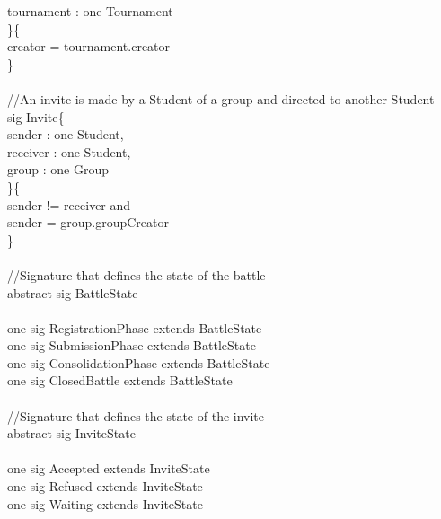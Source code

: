\documentclass{article}
\begin{document}
{\-\hspace{1cm}    tournament : \color{blue} one \color{black} Tournament\\
\}\{\\
\-\hspace{1cm}    creator \color{blue} = \color{black} tournament.creator\\
\}\\
\\
\color{gray}
//An invite is made by a Student of a group and directed to another Student\\
\color{blue}
sig
\color{black}
Invite\{\\
\-\hspace{1cm}    sender : \color{blue} one \color{black} Student,\\
\-\hspace{1cm}    receiver : \color{blue} one \color{black} Student,\\
\-\hspace{1cm}    group : \color{blue} one \color{black} Group\\
\}\{\\
\-\hspace{1cm}    sender \color{blue} != \color{black} receiver \color{blue} and \color{black}\\
\-\hspace{1cm}    sender \color{blue} = \color{black} group.groupCreator \\
\}\\
\\
\color{gray}
//Signature that defines the state of the battle\\
\color{blue} abstract sig \color{black} BattleState{}\\
\\
\color{blue} one sig \color{black}  RegistrationPhase \color{blue} extends \color{black} BattleState{}\\
\color{blue} one sig \color{black}  SubmissionPhase \color{blue} extends \color{black} BattleState{}\\
\color{blue} one sig \color{black}  ConsolidationPhase \color{blue} extends \color{black} BattleState{}\\
\color{blue} one sig \color{black}  ClosedBattle \color{blue} extends \color{black} BattleState{}\\
\\
\color{gray}
//Signature that defines the state of the invite\\
\color{blue} abstract sig \color{black} InviteState{}\\
\\
\color{blue} one sig \color{black} Accepted \color{blue} extends \color{black} InviteState{}\\
\color{blue} one sig \color{black} Refused \color{blue} extends \color{black} InviteState{}\\
\color{blue} one sig \color{black} Waiting \color{blue} extends \color{black} InviteState{}\\
\\
}
\end{document}
